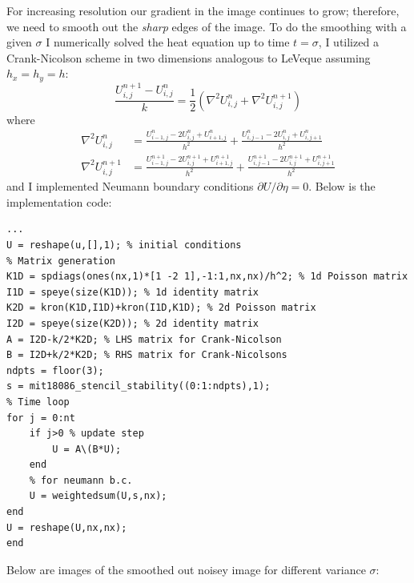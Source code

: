 \documentclass[margin=1in,12pt,3p]{elsarticle}
\begin{document}
For increasing resolution our gradient in the image continues to grow; therefore, we need to smooth out the \textit{sharp} edges of the image. To do the smoothing with a given $\sigma$ I numerically solved the heat equation up to time $t=\sigma$, I utilized a Crank-Nicolson scheme in two dimensions analogous to LeVeque \cite{leveque2007finite} assuming $h_x=h_y=h$:
\[
\frac{U_{i,j}^{n+1}-U_{i,j}^n}{k}=\frac{1}{2}\left(\nabla^2U_{i,j}^n+\nabla^2U_{i,j}^{n+1}\right)
\]
where
\begin{align*}
    \nabla^2U_{i,j}^n&=\frac{U_{i-1,j}^n-2U_{i,j}^n+U_{i+1,j}^n}{h^2}+\frac{U_{i,j-1}^n-2U_{i,j}^n+U_{i,j+1}^n}{h^2}\\
    \nabla^2U_{i,j}^{n+1}&=\frac{U_{i-1,j}^{n+1}-2U_{i,j}^{n+1}+U_{i+1,j}^{n+1}}{h^2}+\frac{U_{i,j-1}^{n+1}-2U_{i,j}^{n+1}+U_{i,j+1}^{n+1}}{h^2}
\end{align*}
and I implemented Neumann boundary conditions $\partial U/\partial\eta=0$. Below is the implementation code:
\begin{lstlisting}
...
U = reshape(u,[],1); % initial conditions
% Matrix generation
K1D = spdiags(ones(nx,1)*[1 -2 1],-1:1,nx,nx)/h^2; % 1d Poisson matrix
I1D = speye(size(K1D)); % 1d identity matrix
K2D = kron(K1D,I1D)+kron(I1D,K1D); % 2d Poisson matrix
I2D = speye(size(K2D)); % 2d identity matrix
A = I2D-k/2*K2D; % LHS matrix for Crank-Nicolson
B = I2D+k/2*K2D; % RHS matrix for Crank-Nicolsons
ndpts = floor(3);
s = mit18086_stencil_stability((0:1:ndpts),1);
% Time loop
for j = 0:nt
    if j>0 % update step
        U = A\(B*U);
    end
    % for neumann b.c.
    U = weightedsum(U,s,nx);
end
U = reshape(U,nx,nx);
end
\end{lstlisting}
\clearpage
Below are images of the smoothed out noisey image for different variance $\sigma$:
\end{document}
